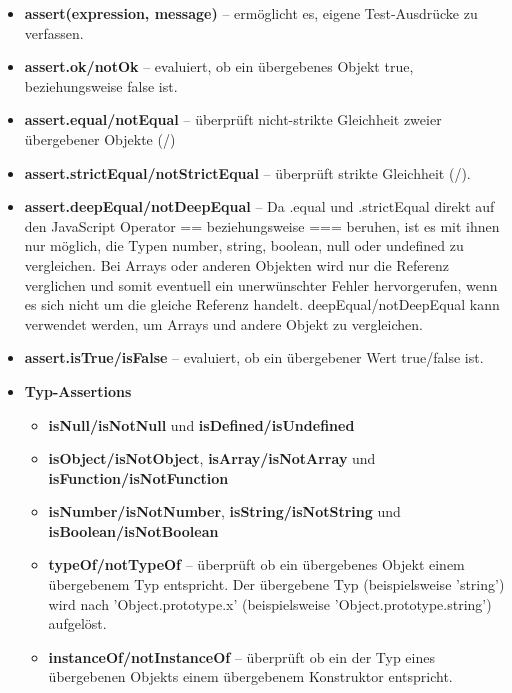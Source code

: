 \begin{itemize}
  \item \textbf{assert(expression, message)} -- ermöglicht es, eigene Test-Ausdrücke zu verfassen.

  \item \textbf{assert.ok/notOk} -- evaluiert, ob ein übergebenes Objekt true, beziehungsweise false ist.
  
  \item \textbf{assert.equal/notEqual} -- überprüft nicht-strikte Gleichheit zweier übergebener Objekte (\glqq{==\grqq}/\glqq{!=\grqq})
  
  \item \textbf{assert.strictEqual/notStrictEqual} -- überprüft strikte Gleichheit (\glqq{===\grqq}/\glqq{!==\grqq}).
  
  \item \textbf{assert.deepEqual/notDeepEqual} -- Da .equal und .strictEqual direkt auf den JavaScript Operator == beziehungsweise === beruhen, ist es mit ihnen nur möglich, die Typen number, string, boolean, null oder undefined zu vergleichen. Bei Arrays oder anderen Objekten wird nur die Referenz verglichen und somit eventuell ein unerwünschter Fehler hervorgerufen, wenn es sich nicht um die gleiche Referenz handelt. deepEqual/notDeepEqual kann verwendet werden, um Arrays und andere Objekt zu vergleichen.
  
  \item \textbf{assert.isTrue/isFalse} -- evaluiert, ob ein übergebener Wert true/false ist.
  
  \item \textbf{Typ-Assertions}
  \begin{itemize}
    \item \textbf{isNull/isNotNull} und \textbf{isDefined/isUndefined}
    \item \textbf{isObject/isNotObject}, \textbf{isArray/isNotArray} und \textbf{isFunction/isNotFunction}
    \item \textbf{isNumber/isNotNumber}, \textbf{isString/isNotString} und \textbf{isBoolean/isNotBoolean}
    \item \textbf{typeOf/notTypeOf} -- überprüft ob ein übergebenes Objekt einem übergebenem Typ entspricht. Der übergebene Typ (beispielsweise 'string') wird nach 'Object.prototype.x' (beispielsweise 'Object.prototype.string') aufgelöst.
    \item \textbf{instanceOf/notInstanceOf} -- überprüft ob ein der Typ eines übergebenen Objekts einem übergebenem Konstruktor entspricht.
  \end{itemize}
  

\end{itemize}
